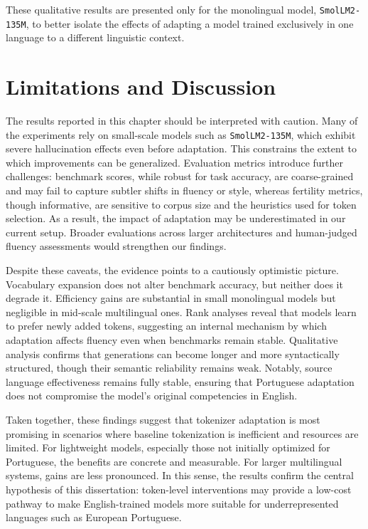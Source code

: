 These qualitative results are presented only for the monolingual model, \texttt{SmolLM2-135M}, to better isolate the effects of adapting a model trained exclusively in one language to a different linguistic context.


\section{Limitations and Discussion}

The results reported in this chapter should be interpreted with caution. Many of the experiments rely on small-scale models such as \texttt{SmolLM2-135M}, which exhibit severe hallucination effects even before adaptation.
This constrains the extent to which improvements can be generalized. Evaluation metrics introduce further challenges: benchmark scores, while robust for task accuracy, are coarse-grained and may fail to capture subtler shifts in fluency or style, whereas fertility metrics, though informative, are sensitive to corpus size and the heuristics used for token selection.
As a result, the impact of adaptation may be underestimated in our current setup. Broader evaluations across larger architectures and human-judged fluency assessments would strengthen our findings.

Despite these caveats, the evidence points to a cautiously optimistic picture.
Vocabulary expansion does not alter benchmark accuracy, but neither does it degrade it.
Efficiency gains are substantial in small monolingual models but negligible in mid-scale multilingual ones.
Rank analyses reveal that models learn to prefer newly added tokens, suggesting an internal mechanism by which adaptation affects fluency even when benchmarks remain stable.
Qualitative analysis confirms that generations can become longer and more syntactically structured, though their semantic reliability remains weak.
Notably, source language effectiveness remains fully stable, ensuring that Portuguese adaptation does not compromise the model’s original competencies in English.

Taken together, these findings suggest that tokenizer adaptation is most promising in scenarios where baseline tokenization is inefficient and resources are limited.
For lightweight models, especially those not initially optimized for Portuguese, the benefits are concrete and measurable.
For larger multilingual systems, gains are less pronounced.
In this sense, the results confirm the central hypothesis of this dissertation: token-level interventions may provide a low-cost pathway to make English-trained models more suitable for underrepresented languages such as European Portuguese.


